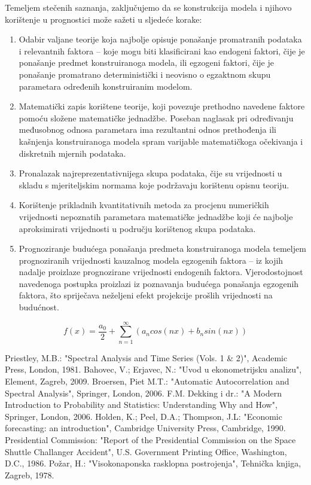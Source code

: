 \documentclass[a4paper,12pt,oneside]{memoir}
\newcommand{\fourierovred}{f(x)= \frac{a_0}{2}+\sum_{n=1}^\infty (a_n cos(nx)+b_n sin(nx))}
\begin{document}
        Temeljem stečenih saznanja, zaključujemo da se konstrukcija modela i njihovo korištenje u prognostici može sažeti u sljedeće korake:
        \begin{enumerate}
            \item Odabir valjane teorije koja najbolje opisuje ponašanje promatranih podataka i relevantnih faktora -- koje mogu biti klasificirani kao endogeni faktori, čije je ponašanje predmet konstruiranoga modela, ili egzogeni faktori, čije je ponašanje promatrano deterministički i neovisno o egzaktnom skupu parametara određenih konstruiranim modelom.
            \item Matematički zapis korištene teorije, koji povezuje prethodno navedene faktore pomoću složene matematičke jednadžbe. Poseban naglasak pri određivanju međusobnog odnosa parametara ima rezultantni odnos prethođenja ili kašnjenja konstruiranoga modela spram varijable matematičkoga očekivanja i diskretnih mjernih podataka.
            \item Pronalazak najreprezentativnijega skupa podataka, čije su vrijednosti u skladu s mjeriteljskim normama koje podržavaju korištenu opisnu teoriju.
            \item Korištenje prikladnih kvantitativnih metoda za procjenu numeričkih vrijednosti nepoznatih parametara matematičke jednadžbe koji će najbolje aproksimirati vrijednosti u području korištenog skupa podataka.
            \item Prognoziranje budućega ponašanja predmeta konstruiranoga modela temeljem prognoziranih vrijednosti kauzalnog modela egzogenih faktora -- iz kojih nadalje proizlaze prognozirane vrijednosti endogenih faktora. Vjerodostojnost navedenoga postupka proizlazi iz poznavanja budućega ponašanja egzogenih faktora, što spriječava neželjeni efekt projekcije prošlih vrijednosti na budućnost.
        \end{enumerate}
        $$\fourierovred$$
    \begin{thebibliography}{9}
         Priestley, M.B.: "Spectral Analysis and Time Series (Vols. 1 \& 2)", Academic Press, London, 1981.
         Bahovec, V.; Erjavec, N.: "Uvod u ekonometrijsku analizu", Element, Zagreb, 2009.
         Broersen, Piet M.T.: "Automatic Autocorrelation and Spectral Analysis", Springer, London, 2006.
         F.M. Dekking i dr.: "A Modern Introduction to Probability and Statistics: Understanding Why and How", Springer, London, 2006.
         Holden, K.; Peel, D.A.; Thompson, J.L: "Economic forecasting: an introduction", Cambridge University Press, Cambridge, 1990.
         Presidential Commission: "Report of the Presidential Commission on the Space Shuttle Challanger Accident", U.S. Government Printing Office, Washington, D.C., 1986.
         Požar, H.: "Visokonaponska rasklopna postrojenja", Tehnička knjiga, Zagreb, 1978.
    \end{thebibliography}
\end{document}
